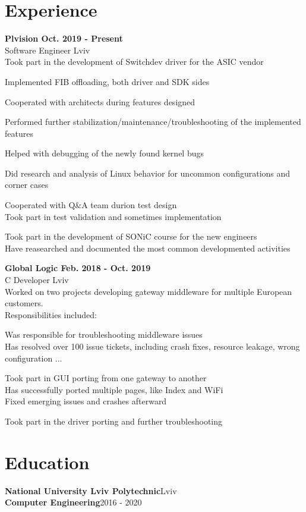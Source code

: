 \documentclass{article}
\begin{document}
\section{Experience}
{\bfseries
Plvision \hspace*{\fill}Oct. 2019 - Present\\
}
\vspace{0.5em}
Software Engineer  \hspace*{\fill}Lviv\\
Took part in the development of Switchdev driver for the ASIC vendor
\begin{description}[align=left,leftmargin=3mm,style=multiline]
\item[-] Implemented FIB offloading, both driver and SDK sides
\item[-] Cooperated with architects during features designed
\item[-] Performed further stabilization/maintenance/troubleshooting of the implemented features
\item[-] Helped with debugging of the newly found kernel bugs
\item[-] Did research and analysis of Linux behavior for uncommon configurations and corner cases
\item[-] Cooperated with Q\&A team durion test design\\
         Took part in test validation and sometimes implementation
\item[-] Took part in the development of SONiC course for the new engineers \\
         Have reasearched and documented the most common developmented activities

\end{description}

\clearpage

{\bfseries
Global Logic \hspace*{\fill}Feb. 2018 - Oct. 2019\\
}
\vspace{0.5em}
C Developer  \hspace*{\fill}Lviv\\
Worked on two projects developing gateway middleware for multiple European customers.\\
Responsibilities included:
\begin{description}[align=left,leftmargin=3mm,style=multiline]
\item[-] Was responsible for troubleshooting middleware issues \\
         Has resolved over 100 issue tickets, including crash fixes, resource leakage,
         wrong configuration ...
\item[-] Took part in GUI porting from one gateway to another \\
         Has successfully ported multiple pages, like Index and WiFi \\
         Fixed emerging issues and crashes afterward 
\item[-] Took part in the driver porting and further troubleshooting
\end{description}

\section{Education}
\textbf{National University Lviv Polytechnic}\hspace*{\fill}Lviv\\
\textbf{Computer Engineering}\hspace*{\fill}2016 - 2020
\end{document}
